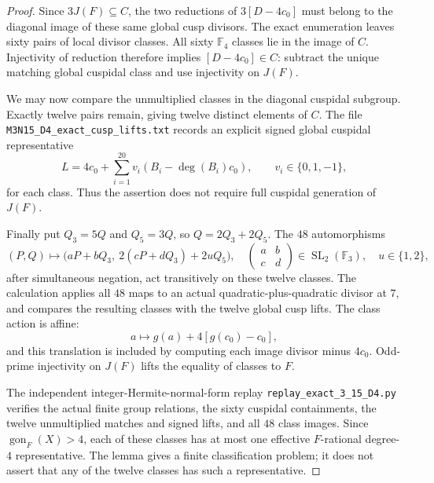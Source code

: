 \begin{proof}
Since $3J(F)\subseteq C$, the two reductions of
$3[D-4c_0]$ must belong to the diagonal image of these same
global cusp divisors. The exact enumeration leaves sixty
pairs of local divisor classes. All sixty $\mathbb F_4$
classes lie in the image of $C$. Injectivity of reduction
therefore implies $[D-4c_0]\in C$: subtract the unique
matching global cuspidal class and use injectivity on
$J(F)$.

We may now compare the unmultiplied classes in the diagonal
cuspidal subgroup. Exactly twelve pairs remain, giving
twelve distinct elements of $C$. The file
\texttt{M3N15\_D4\_exact\_cusp\_lifts.txt} records an explicit
signed global cuspidal representative
\[
 L=4c_0+\sum_{i=1}^{20}v_i(B_i-\deg(B_i)c_0),
 \qquad v_i\in\{0,1,-1\},
\]
for each class. Thus the assertion does not require full
cuspidal generation of $J(F)$.

Finally put $Q_3=5Q$ and $Q_5=3Q$, so
$Q=2Q_3+2Q_5$. The $48$ automorphisms
\[
 (P,Q)\longmapsto
 \bigl(aP+bQ_3,\ 2(cP+dQ_3)+2uQ_5\bigr),
 \quad
 \begin{pmatrix}a&b\\c&d\end{pmatrix}\in
 \operatorname{SL}_2(\mathbb F_3),\quad u\in\{1,2\},
\]
after simultaneous negation, act transitively on these
twelve classes. The calculation applies all $48$ maps to
an actual quadratic-plus-quadratic divisor at $7$, and
compares the resulting classes with the twelve global cusp
lifts. The class action is affine:
\[
 a\longmapsto g(a)+4[g(c_0)-c_0],
\]
and this translation is included by computing each image
divisor minus $4c_0$. Odd-prime injectivity on $J(F)$ lifts
the equality of classes to $F$.

The independent integer-Hermite-normal-form replay
\texttt{replay\_exact\_3\_15\_D4.py} verifies the actual finite
group relations, the sixty cuspidal containments, the twelve
unmultiplied matches and signed lifts, and all $48$ class
images. Since $\operatorname{gon}_F(X)>4$, each of these
classes has at most one effective $F$-rational degree-$4$
representative. The lemma gives a finite classification
problem; it does not assert that any of the twelve classes
has such a representative.
\end{proof}
